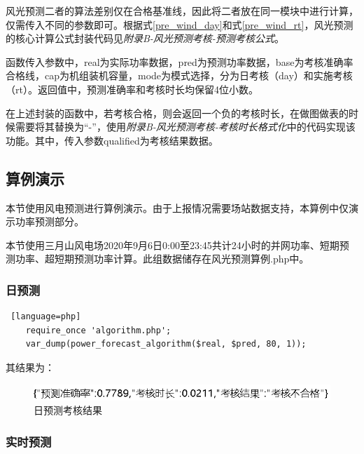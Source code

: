 \documentclass[winfonts,UTF8,a4paper]{ctexart}
\begin{document}
风光预测二者的算法差别仅在合格基准线，因此将二者放在同一模块中进行计算，仅需传入不同的参数即可。根据式\ref{pre_wind_day}和式\ref{pre_wind_rt}，风光预测的核心计算公式封装代码见\textit{附录B-风光预测考核-预测考核公式}。

函数传入参数中，real为实际功率数据，pred为预测功率数据，base为考核准确率合格线，cap为机组装机容量，mode为模式选择，分为日考核（day）和实施考核（rt）。返回值中，预测准确率和考核时长均保留4位小数。

在上述封装的函数中，若考核合格，则会返回一个负的考核时长，在做图做表的时候需要将其替换为“-”，使用\textit{附录B-风光预测考核-考核时长格式化}中的代码实现该功能。其中，传入参数qualified为考核结果数据。


\subsection{算例演示}
本节使用风电预测进行算例演示。由于上报情况需要场站数据支持，本算例中仅演示功率预测部分。

本节使用三月山风电场2020年9月6日0:00至23:45共计24小时的并网功率、短期预测功率、超短期预测功率计算。此组数据储存在风光预测算例.php中。

\subsubsection{日预测}

\begin{lstlisting} [language=php]
	require_once 'algorithm.php';
	var_dump(power_forecast_algorithm($real, $pred, 80, 1));
\end{lstlisting}

其结果为：
\begin{figure}[H]
	\centering
	\includegraphics[width=0.7\linewidth]{pic/screenshot008}
	\caption{日预测考核结果}
	\label{fig:screenshot008}
\end{figure}



\subsubsection{实时预测}
\end{document}
